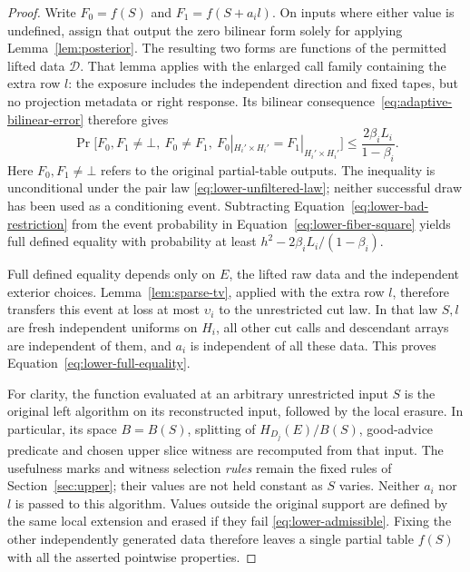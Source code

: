 \begin{proof}
Write $F_0=f(S)$ and $F_1=f(S+a_i l)$.  On inputs where either value
is undefined, assign that output the zero bilinear form solely for applying
Lemma~\ref{lem:posterior}.  The resulting two forms are functions of the
permitted lifted data $\mathcal D$.  That lemma applies with the enlarged
call family containing the extra row $l$: the exposure includes the
independent direction and fixed tapes, but no projection metadata or right
response.  Its bilinear consequence~\eqref{eq:adaptive-bilinear-error}
therefore gives
\begin{equation}\label{eq:lower-bad-restriction}
 \Pr\bigl[F_0,F_1\ne\bot,\ F_0\ne F_1,
                   \ F_0|_{H_i'\times H_i'}=F_1|_{H_i'\times H_i'}\bigr]
       \leq\frac{2\beta_i L_i}{1-\beta_i}.
\end{equation}
Here $F_0,F_1\ne\bot$ refers to the original partial-table outputs.
The inequality is unconditional under the pair law
\eqref{eq:lower-unfiltered-law}; neither successful draw has been used
as a conditioning event.  Subtracting
Equation~\ref{eq:lower-bad-restriction} from the event probability in
Equation~\ref{eq:lower-fiber-square} yields full defined equality with
probability at least $h^2-2\beta_i L_i/(1-\beta_i)$.

Full defined equality depends only on $E$, the lifted raw data and the
independent exterior choices.  Lemma~\ref{lem:sparse-tv}, applied with
the extra row $l$, therefore transfers this event at loss at most
$\upsilon_i$ to the unrestricted cut law.  In that law $S,l$ are fresh
independent uniforms on $H_i$, all other cut calls and descendant
arrays are independent of them, and $a_i$ is independent of all these
data.  This proves Equation~\ref{eq:lower-full-equality}.

For clarity, the function evaluated at an arbitrary unrestricted input
$S$ is the original left algorithm on its reconstructed input, followed
by the local erasure.  In particular, its space $B=B(S)$, splitting of
$H_{D_j}(E)/B(S)$, good-advice predicate and chosen upper slice witness
are recomputed from that input.  The usefulness marks and witness
selection \emph{rules} remain the fixed rules of
Section~\ref{sec:upper}; their values are not held constant as $S$
varies.  Neither $a_i$ nor $l$ is passed to this algorithm.  Values
outside the original support are defined by the same local extension
and erased if they fail \eqref{eq:lower-admissible}.  Fixing the other
independently generated data therefore leaves a single partial table
$f(S)$ with all the asserted pointwise properties.
\end{proof}


